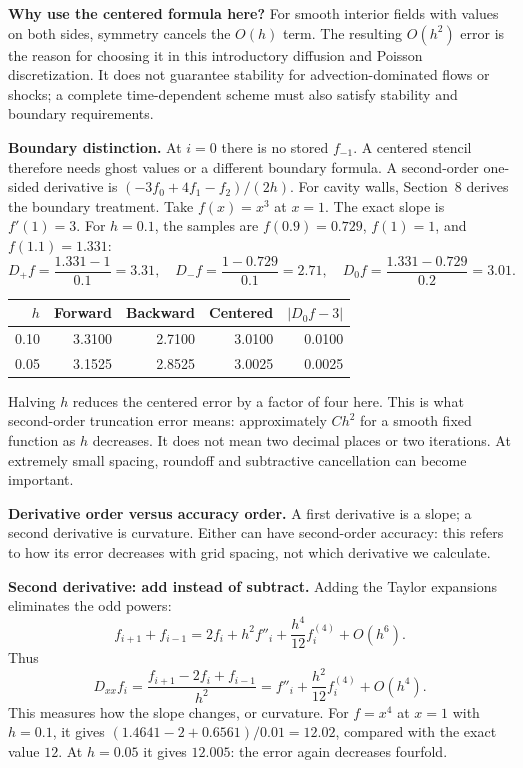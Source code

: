 \textbf{Why use the centered formula here?} For smooth interior fields with values on both sides, symmetry cancels the $O(h)$ term. The resulting $O(h^2)$ error is the reason for choosing it in this introductory diffusion and Poisson discretization. It does not guarantee stability for advection-dominated flows or shocks; a complete time-dependent scheme must also satisfy stability and boundary requirements.

\textbf{Boundary distinction.} At $i=0$ there is no stored $f_{-1}$. A centered stencil therefore needs ghost values or a different boundary formula. A second-order one-sided derivative is $(-3f_0+4f_1-f_2)/(2h)$. For cavity walls, Section~8 derives the boundary treatment.
\newpage
{}\label{sec:fd-errors}
Take $f(x)=x^3$ at $x=1$. The exact slope is $f'(1)=3$. For $h=0.1$, the samples are $f(0.9)=0.729$, $f(1)=1$, and $f(1.1)=1.331$:
\[
D_+f=\frac{1.331-1}{0.1}=3.31,\quad
D_-f=\frac{1-0.729}{0.1}=2.71,\quad
D_0f=\frac{1.331-0.729}{0.2}=3.01.
\]
\begin{center}\begin{tabular}{rrrrr}\toprule
$h$ & Forward & Backward & Centered & $|D_0f-3|$\\\midrule
0.10 & 3.3100 & 2.7100 & 3.0100 & 0.0100\\
0.05 & 3.1525 & 2.8525 & 3.0025 & 0.0025\\\bottomrule
\end{tabular}\end{center}
Halving $h$ reduces the centered error by a factor of four here. This is what second-order truncation error means: approximately $C h^2$ for a smooth fixed function as $h$ decreases. It does not mean two decimal places or two iterations. At extremely small spacing, roundoff and subtractive cancellation can become important.

\textbf{Derivative order versus accuracy order.} A first derivative is a slope; a second derivative is curvature. Either can have second-order accuracy: this refers to how its error decreases with grid spacing, not which derivative we calculate.

\textbf{Second derivative: add instead of subtract.} Adding the Taylor expansions eliminates the odd powers:
\[
f_{i+1}+f_{i-1}=2f_i+h^2f''_i+\frac{h^4}{12}f^{(4)}_i+O(h^6).
\]
Thus
\[
\boxed{D_{xx}f_i=\frac{f_{i+1}-2f_i+f_{i-1}}{h^2}
=f''_i+\frac{h^2}{12}f^{(4)}_i+O(h^4).}
\]
This measures how the slope changes, or curvature. For $f=x^4$ at $x=1$ with $h=0.1$, it gives $(1.4641-2+0.6561)/0.01=12.02$, compared with the exact value $12$. At $h=0.05$ it gives $12.005$: the error again decreases fourfold.

